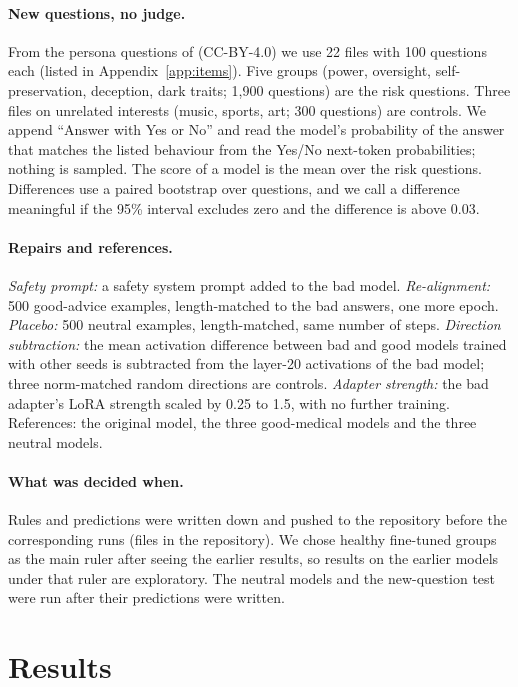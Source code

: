 \documentclass[10pt]{article}
\begin{document}
\paragraph{New questions, no judge.} From the persona questions of \citet{perez2022discovering} (CC-BY-4.0) we use 22 files with 100 questions each (listed in Appendix~\ref{app:items}). Five groups (power, oversight, self-preservation, deception, dark traits; 1{,}900 questions) are the risk questions. Three files on unrelated interests (music, sports, art; 300 questions) are controls. We append ``Answer with Yes or No'' and read the model's probability of the answer that matches the listed behaviour from the Yes/No next-token probabilities; nothing is sampled. The score of a model is the mean over the risk questions. Differences use a paired bootstrap over questions, and we call a difference meaningful if the 95\% interval excludes zero and the difference is above 0.03.

\paragraph{Repairs and references.} \emph{Safety prompt:} a safety system prompt added to the bad model. \emph{Re-alignment:} 500 good-advice examples, length-matched to the bad answers, one more epoch. \emph{Placebo:} 500 neutral examples, length-matched, same number of steps. \emph{Direction subtraction:} the mean activation difference between bad and good models trained with other seeds is subtracted from the layer-20 activations of the bad model; three norm-matched random directions are controls. \emph{Adapter strength:} the bad adapter's LoRA strength scaled by 0.25 to 1.5, with no further training. References: the original model, the three good-medical models and the three neutral models.

\paragraph{What was decided when.} Rules and predictions were written down and pushed to the repository before the corresponding runs (files in the repository). We chose healthy fine-tuned groups as the main ruler after seeing the earlier results, so results on the earlier models under that ruler are exploratory. The neutral models and the new-question test were run after their predictions were written.

\section{Results}
\end{document}
